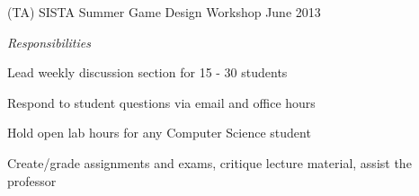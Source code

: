\documentclass[11pt,letterpaper]{article}
\begin{document}
\begin{minipage}{\textwidth}
\begin{adjustwidth}{2em}{0pt}
\hspace{2em}(TA) SISTA Summer Game Design Workshop \hfill June 2013

\vspace{4mm}
{\large \emph {Responsibilities}}

\hspace{2em}Lead weekly discussion section for 15 - 30 students

\hspace{2em}Respond to student questions via email and office hours

\hspace{2em}Hold open lab hours for any Computer Science student

\hspace{2em}Create/grade assignments and exams, critique lecture material, assist the professor
\end{adjustwidth}

\end{minipage}
\end{document}
